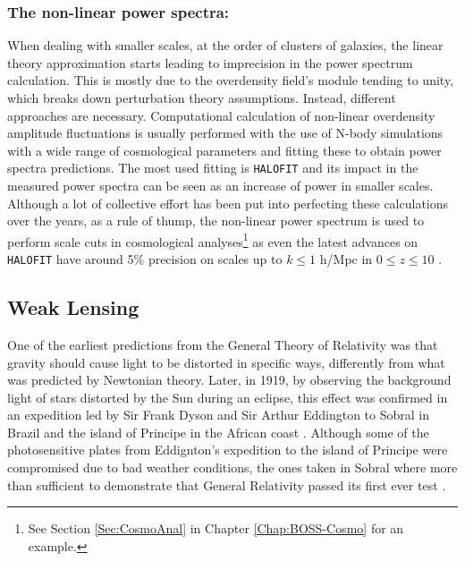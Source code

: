 \subsubsection{The non-linear power spectra:}
When dealing with smaller scales, at the order of clusters of galaxies, the linear theory approximation starts leading to imprecision in the power spectrum calculation. This is mostly due to the overdensity field's module tending to unity, which breaks down perturbation theory assumptions. Instead, different approaches are necessary. Computational calculation of non-linear overdensity amplitude fluctuations is usually performed with the use of N-body simulations with a wide range of cosmological parameters and fitting these to obtain power spectra predictions. The most used fitting is \texttt{HALOFIT} \citep{2003HaloFit,2012-Halofit,Bird2012} and its impact in the measured power spectra can be seen as an increase of power in smaller scales. Although a lot of collective effort has been put into perfecting these calculations over the years, as a rule of thump, the non-linear power spectrum is used to perform scale cuts in cosmological analyses\footnote{See Section \ref{Sec:CosmoAnal} in Chapter \ref{Chap:BOSS-Cosmo} for an example.} as even the latest advances on \texttt{HALOFIT} have around 5\% precision on scales up to $k\leq 1$ h/Mpc in $0\leq z \leq 10$ \citep{2012-Halofit,Bird2012}. 

\subsection{Weak Lensing}
One of the earliest predictions from the General Theory of Relativity was that gravity should cause light to be distorted in specific ways, differently from what was predicted by Newtonian theory. Later, in 1919, by observing the background light of stars distorted by the Sun during an eclipse, this effect was confirmed in an expedition led by Sir Frank Dyson and Sir Arthur Eddington to Sobral in Brazil and the island of Principe in the African coast \citep{Dyson291}. Although some of the photosensitive plates from Eddignton's expedition to the island of Principe were compromised due to bad weather conditions, the ones taken in Sobral where more than sufficient to demonstrate that General Relativity passed its first ever test \citep{2007arXiv0709.0685K}.


